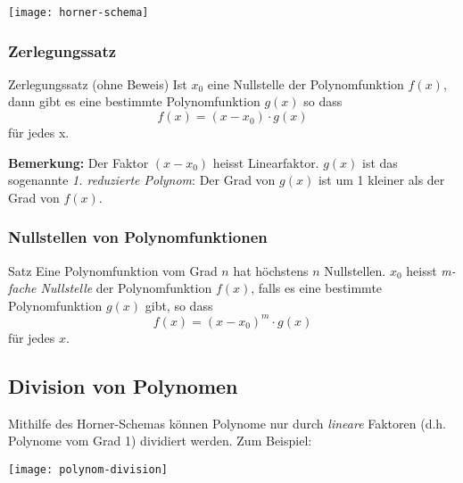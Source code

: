 \vspace{-\topsep}

\texttt{[image: horner-schema]}

\subsubsection{Zerlegungssatz}

\begin{definition}{Zerlegungssatz (ohne Beweis)}
    Ist $x_0$ eine Nullstelle der Polynomfunktion $f(x)$, dann gibt es eine bestimmte Polynomfunktion $g(x)$ so dass \[f(x) = (x - x_0) \cdot g(x)\] für jedes x.
\end{definition}

\textbf{Bemerkung:} Der Faktor $(x - x_0)$ heisst Linearfaktor. $g(x)$ ist das sogenannte \emph{1. reduzierte Polynom}: Der Grad von $g(x)$ ist um 1 kleiner als der Grad von $f(x)$.

\subsubsection{Nullstellen von Polynomfunktionen}

\begin{definition}{Satz}
    Eine Polynomfunktion vom Grad $n$ hat höchstens $n$ Nullstellen.
    $x_0$ heisst \emph{m-fache Nullstelle} der Polynomfunktion $f(x)$, falls es eine bestimmte Polynomfunktion $g(x)$ gibt, so dass \[f(x) = (x - x_0)^m \cdot g(x)\] für jedes $x$.
\end{definition}

\subsection{Division von Polynomen}\label{subsec:division-von-polynomen}

Mithilfe des Horner-Schemas können Polynome nur durch \emph{lineare} Faktoren (d.h. Polynome vom Grad 1) dividiert werden.
Zum Beispiel:

\texttt{[image: polynom-division]}